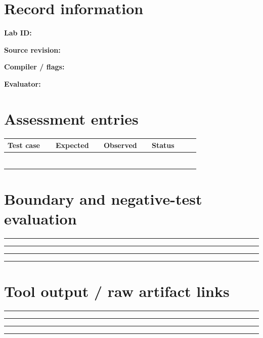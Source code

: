\documentclass[10pt,letterpaper]{article}
\begin{document}
\makedoctitle
\makedocsummary
\section{Record information}
\noindent\textbf{Lab ID:}\quad\hrulefill\par\vspace{11pt}
\noindent\textbf{Source revision:}\quad\hrulefill\par\vspace{11pt}
\noindent\textbf{Compiler / flags:}\quad\hrulefill\par\vspace{11pt}
\noindent\textbf{Evaluator:}\quad\hrulefill\par\vspace{11pt}
\section{Assessment entries}
\begin{longtable}{|p{0.215\linewidth}|p{0.215\linewidth}|p{0.215\linewidth}|p{0.215\linewidth}|}
\hline
\textbf{Test case} & \textbf{Expected} & \textbf{Observed} & \textbf{Status}\\\hline
\endhead
\rule{0pt}{27pt} & & & \\\hline
\rule{0pt}{27pt} & & & \\\hline
\rule{0pt}{27pt} & & & \\\hline
\rule{0pt}{27pt} & & & \\\hline
\rule{0pt}{27pt} & & & \\\hline
\rule{0pt}{27pt} & & & \\\hline
\end{longtable}
\section{Boundary and negative-test evaluation}
\noindent\rule{\linewidth}{0.4pt}\par\vspace{16pt}
\noindent\rule{\linewidth}{0.4pt}\par\vspace{16pt}
\noindent\rule{\linewidth}{0.4pt}\par\vspace{16pt}
\noindent\rule{\linewidth}{0.4pt}\par\vspace{16pt}
\section{Tool output / raw artifact links}
\noindent\rule{\linewidth}{0.4pt}\par\vspace{16pt}
\noindent\rule{\linewidth}{0.4pt}\par\vspace{16pt}
\noindent\rule{\linewidth}{0.4pt}\par\vspace{16pt}
\noindent\rule{\linewidth}{0.4pt}\par\vspace{16pt}
\end{document}
